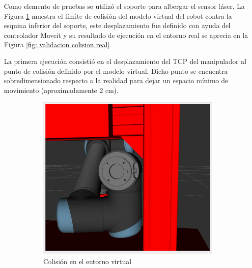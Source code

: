 Como elemento de pruebas se utilizó el soporte para albergar el sensor láser. La Figura \ref{fig: estado colisones entorno virtual} muestra el límite de colisión del modelo virtual del robot contra la esquina inferior del soporte, este desplazamiento fue definido con ayuda del controlador Moveit y su resultado de ejecución en el entorno real se aprecia en la Figura \ref{fig: validacion colision real}. 

La primera ejecución consistió en el desplazamiento del \acrshort{TCP} del manipulador al punto de colisión definido por el modelo virtual. Dicho punto se encuentra sobredimensionado respecto a la realidad para dejar un espacio mínimo de movimiento (aproximadamente 2 cm). 

\begin{figure}[h!]
    \centering
     \begin{subfigure}[h]{0.45\linewidth} 
        \centering
        \includegraphics[scale=0.15]{figuras/estado colisiones entorno virtual.png}
        \caption{Colisión en el entorno virtual}
        \label{fig: estado colisones entorno virtual}
    \end{subfigure}
    \begin{subfigure}[h]{0.45\linewidth} 
        \centering

\end{subfigure}
\end{figure}
